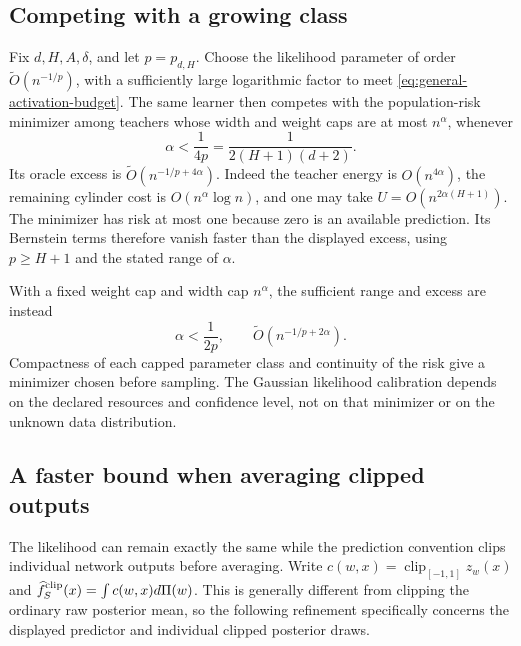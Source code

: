 \subsection{Competing with a growing class}

Fix $d,H,A,\delta$, and let $p=p_{d,H}$. Choose the likelihood parameter
of order $\widetilde O(n^{-1/p})$, with a sufficiently large logarithmic
factor to meet \eqref{eq:general-activation-budget}. The same learner
then competes with the population-risk minimizer among teachers whose
width and weight caps are at most $n^\alpha$, whenever
\[
 \alpha<\frac1{4p}=\frac1{2(H+1)(d+2)}.
\]
Its oracle excess is $\widetilde O(n^{-1/p+4\alpha})$.
Indeed the teacher energy is $O(n^{4\alpha})$, the remaining cylinder
cost is $O(n^\alpha\log n)$, and one may take
$U=O(n^{2\alpha(H+1)})$. The minimizer has risk at most one because
zero is an available prediction. Its Bernstein terms therefore vanish
faster than the displayed excess, using $p\geq H+1$ and the stated
range of $\alpha$.

With a fixed weight cap and width cap $n^\alpha$, the sufficient range
and excess are instead
\[
 \alpha<\frac1{2p},\qquad
 \widetilde O(n^{-1/p+2\alpha}).
\]
Compactness of each capped parameter class and continuity of the risk
give a minimizer chosen before sampling. The Gaussian likelihood
calibration depends on the declared resources and confidence level,
not on that minimizer or on the unknown data distribution.

\subsection{A faster bound when averaging clipped outputs}

The likelihood can remain exactly the same while the prediction
convention clips individual network outputs before averaging.  Write
$c(w,x)=\operatorname{clip}_{[-1,1]}z_w(x)$ and
$\widehat f_S^{\rm clip}(x)=\int c(w,x)d\Pi(w)$.
This is generally different from clipping the ordinary raw posterior
mean, so the following refinement specifically concerns the displayed
predictor and individual clipped posterior draws.

